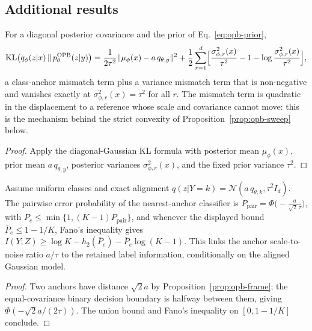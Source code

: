 \subsection{Additional results}

\begin{lemma}
\label{lem:opb-kl-decomposition}
For a diagonal posterior covariance and the prior of Eq.~\eqref{eq:opb-prior},
\begin{equation}
\operatorname{KL}\bigl(q_\phi(z|x)\,\|\,p_\theta^{\mathrm{OPB}}(z|y)\bigr)
= \frac{1}{2\tau^2}\|\mu_\phi(x) - a\,q_{\theta,y}\|^2
+ \frac12 \sum_{r=1}^{d}\Bigl[
\frac{\sigma_{\phi,r}^2(x)}{\tau^2} - 1 - \log\frac{\sigma_{\phi,r}^2(x)}{\tau^2}
\Bigr],
\label{eq:opb-kl-decomposition}
\end{equation}
a class-anchor mismatch term plus a variance mismatch term that is non-negative and
vanishes exactly at $\sigma_{\phi,r}^2(x) = \tau^2$ for all $r$. The mismatch term is
quadratic in the displacement to a reference whose scale and covariance cannot move:
this is the mechanism behind the strict convexity of
Proposition~\ref{prop:opb-sweep} below.
\end{lemma}

\begin{proof}
Apply the diagonal-Gaussian KL formula with posterior mean $\mu_\phi(x)$, prior mean
$a\,q_{\theta,y}$, posterior variances $\sigma_{\phi,r}^2(x)$, and the fixed prior
variance $\tau^2$.
\end{proof}

\begin{corollary}
\label{cor:opb-fano}
Assume uniform classes and exact alignment
$q(z|Y=k) = \mathcal{N}(a\,q_{\theta,k}, \tau^2 I_d)$. The pairwise error probability
of the nearest-anchor classifier is
$P_{\mathrm{pair}} = \Phi\bigl(-\frac{a}{\sqrt{2}\,\tau}\bigr)$, with
$P_e \le \min\{1, (K-1)P_{\mathrm{pair}}\}$, and whenever the displayed bound
$\bar P_e \le 1 - 1/K$, Fano's inequality gives
$I(Y;Z) \ge \log K - h_2(\bar P_e) - \bar P_e \log(K-1)$. This links the anchor
scale-to-noise ratio $a/\tau$ to the retained label information, conditionally on the
aligned Gaussian model.
\end{corollary}

\begin{proof}
Two anchors have distance $\sqrt{2}a$ by Proposition~\ref{prop:opb-frame}; the
equal-covariance binary decision boundary is halfway between them, giving
$\Phi(-\sqrt{2}a/(2\tau))$. The union bound and Fano's inequality on
$[0, 1-1/K]$ conclude.
\end{proof}

